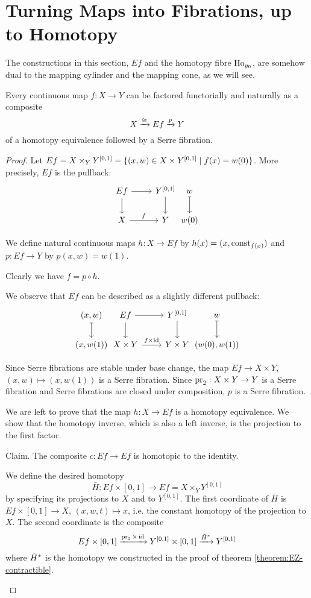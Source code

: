\section{Turning Maps into Fibrations, up to Homotopy}

The constructions in this section, $Ef$ and the homotopy fibre $\operatorname{Ho}_{y_0}$, are somehow dual to the mapping cylinder and the mapping cone, as we will see.

\begin{theorem}\label{theorem:factorization-equivalence-fibration}
Every continuous map $f:X\to Y$ can be factored functorially and naturally as a composite
\[X\xrightarrow{\cong}Ef\xrightarrow{p} Y\]
of a homotopy equivalence followed by a Serre fibration.
\end{theorem}

\begin{proof}
Let $Ef=X\times_Y Y^{[0,1]}=\{(x,w)\in X\times Y^{[0,1]}\mid f(x)=w(0)\}$. More precisely, $Ef$ is the pullback:
\[\begin{tikzcd}
Ef \arrow[d] \arrow[r] & Y^{[0,1]} \arrow[d] &[-6ex] w \ar[d,mapsto] \\
X \arrow[r,"f"] & Y & w(0)
\end{tikzcd}\]

We define natural continuous maps $h:X\to Ef$ by $h(x)=(x,\operatorname{const}_{f(x)})$ and $p:Ef\to Y$ by $p(x,w)=w(1)$.

Clearly we have $f=p\circ h$.

We observe that $Ef$ can be described as a slightly different pullback:
\[\begin{tikzcd}
(x,w) \ar[d,mapsto] &[-6ex] Ef \arrow[d] \arrow[r] & Y^{[0,1]} \arrow[d] &[-6ex] w \ar[d,mapsto]\\
(x,w(1)) & X\times Y \arrow[r,"f\times\id"] & Y\times Y & (w(0),w(1))
\end{tikzcd}\]

Since Serre fibrations are stable under base change, the map $Ef\to X\times Y$, $(x,w)\mapsto(x,w(1))$ is a Serre fibration. Since $\operatorname{pr}_2:X\times Y\to Y$ is a Serre fibration and Serre fibrations are closed under composition, $p$ is a Serre fibration. 

We are left to prove that the map $h:X\to Ef$ is a homotopy equivalence. We show that the homotopy inverse, which is also a left inverse, is the projection to the first factor.

Claim. The composite $c:Ef\to Ef$ is homotopic to the identity.

\begin{claimproof}
We define the desired homotopy
\[\bar H:Ef\times[0,1]\to Ef=X\times_Y Y^{[0,1]}\]
by specifying its projections to $X$ and to $Y^{[0,1]}$. The first coordinate of $\bar H$ is $Ef\times[0,1]\to X$, $(x,w,t)\mapsto x$, i.e. the constant homotopy of the projection to $X$. The second coordinate is the composite
\[Ef\times[0,1]\xrightarrow{\operatorname{pr}_2\times\operatorname{id}} Y^{[0,1]}\times [0,1]\xrightarrow{\tilde H^*} Y^{[0,1]}\]
where $\tilde H^*$ is the homotopy we constructed in the proof of theorem \ref{theorem:EZ-contractible}.


\end{claimproof}
\end{proof}
